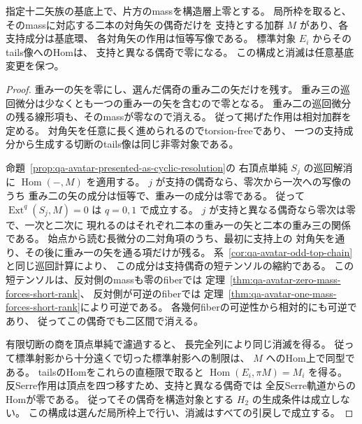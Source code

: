 \begin{proposition}[各mass壁での標準pointingの直接的な生成障害]
\label{prop:qa-avatar-presented-pointing-module}
指定十二矢族の基底上で、片方のmassを構造層上零とする。
局所枠を取ると、そのmassに対応する二本の対角矢の偶奇だけを
支持とする加群 $M$ があり、各支持成分は基底環、
各対角矢の作用は恒等写像である。
標準対象 $E_i$ からそのtails像へのHomは、
支持と異なる偶奇で零になる。
この構成と消滅は任意基底変更を保つ。
\end{proposition}
\begin{proof}
重み一の矢を零にし、選んだ偶奇の重み二の矢だけを残す。
重み三の巡回微分は少なくとも一つの重み一の矢を含むので零となる。
重み二の巡回微分の残る線形項も、そのmassが零なので消える。
従って掲げた作用は相対加群を定める。
対角矢を任意に長く進められるのでtorsion-freeであり、
一つの支持成分から生成する切断のtails像は同じ非零対象である。

命題~\ref{prop:qa-avatar-presented-as-cyclic-resolution}の
右頂点単純 $S_j$ の巡回解消に $\operatorname{Hom}(-,M)$ を適用する。
$j$ が支持の偶奇なら、零次から一次への写像のうち
重み二の矢の成分は恒等で、重み一の成分は零である。
従って $\operatorname{Ext}^q(S_j,M)=0$ は $q=0,1$ で成立する。
$j$ が支持と異なる偶奇なら零次は零で、一次と二次に
現れるのはそれぞれ二本の重み一の矢と二本の重み三の関係である。
始点から読む長微分の二対角項のうち、最初に支持上の
対角矢を通り、その後に重み一の矢を通る項だけが残る。
系~\ref{cor:qa-avatar-odd-top-chain}と同じ巡回計算により、
この成分は支持偶奇の短テンソルの縮約である。
この短テンソルは、反対側のmassも零のfiberでは
定理~\ref{thm:qa-avatar-zero-mass-forces-short-rank}、
反対側が可逆のfiberでは
定理~\ref{thm:qa-avatar-one-mass-forces-short-rank}により可逆である。
各幾何fiberの可逆性から相対的にも可逆であり、
従ってこの偶奇でも二区間で消える。

有限切断の商を頂点単純で濾過すると、
長完全列により同じ消滅を得る。
従って標準射影から十分遠くで切った標準射影への制限は、
$M$ へのHom上で同型である。
tailsのHomをこれらの直極限で取ると
$\operatorname{Hom}(E_i,\pi M)=M_i$ を得る。
反Serre作用は頂点を四つ移すため、支持と異なる偶奇では
全反Serre軌道からのHomが零である。
従ってその偶奇を構造対象とする $H_2$ の生成条件は成立しない。
この構成は選んだ局所枠上で行い、消滅はすべての引戻しで成立する。
\end{proof}

